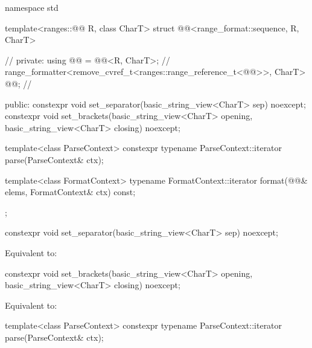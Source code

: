 %
\begin{codeblock}
namespace std {
  template<ranges::@@ R, class CharT>
  struct @@<range_format::sequence, R, CharT> {    // \expos
  private:
    using @@ = @@<R, CharT>;                    // \expos
    range_formatter<remove_cvref_t<ranges::range_reference_t<@@>>,
                    CharT> @@;                                 // \expos

  public:
    constexpr void set_separator(basic_string_view<CharT> sep) noexcept;
    constexpr void set_brackets(basic_string_view<CharT> opening,
                                basic_string_view<CharT> closing) noexcept;

    template<class ParseContext>
      constexpr typename ParseContext::iterator
        parse(ParseContext& ctx);

    template<class FormatContext>
      typename FormatContext::iterator
        format(@@& elems, FormatContext& ctx) const;
  };
}
\end{codeblock}

%
\begin{itemdecl}
constexpr void set_separator(basic_string_view<CharT> sep) noexcept;
\end{itemdecl}

\begin{itemdescr}
\pnum
\effects
Equivalent to: 
\end{itemdescr}

%
\begin{itemdecl}
constexpr void set_brackets(basic_string_view<CharT> opening,
                            basic_string_view<CharT> closing) noexcept;
\end{itemdecl}

\begin{itemdescr}
\pnum
\effects
Equivalent to: 
\end{itemdescr}

%
\begin{itemdecl}
template<class ParseContext>
  constexpr typename ParseContext::iterator
    parse(ParseContext& ctx);
\end{itemdecl}

